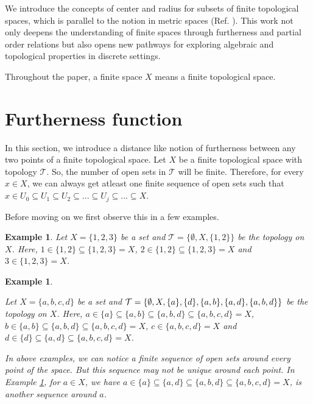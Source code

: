 \documentclass[12pt]{amsart}
\newtheorem{example}[definition]{Example}
\begin{document}
		We introduce the concepts of center and radius for subsets of finite topological spaces, which is parallel to the notion in metric spaces (Ref. \cite{Badra}). 
    	This work not only deepens the understanding of finite spaces through furtherness and partial order relations but also opens new pathways for exploring algebraic and topological properties in discrete settings.\par
	

	
	Throughout the paper, a finite space $X$ means a finite topological space.
	
	
	
	\section{\textbf{Furtherness function}}	\label{s2.1}
	
	
	In this section, we introduce a distance like notion of furtherness between any two points of a finite topological space. Let $X$ be a finite topological space with topology $\mathcal{T}$.
	So, the number of open sets in $\mathcal{T}$ will be finite. Therefore, for every $x\in X$, we can always get atleast one finite sequence of open sets such that $x\in U_0\subseteq U_1\subseteq U_2 \subseteq...\subseteq U_j\subseteq  ... \subseteq  X$.\par
	
	Before moving on we first observe this in a few examples.
	
	\begin{example}\label{2.1}
		{\normalfont
			Let $X=\{1,2,3\}$ be a set and $\mathcal{T}=\{\emptyset,X,\{1,2\}\}$ be the topology on $X$.
			Here, $1\in \{1,2\}\subseteq\{1,2,3\}=X$,  $2\in \{1,2\}\subseteq\{1,2,3\}=X$ and $3 \in\{1,2,3\}=X$.
		}
	\end{example}
	
	\begin{example}\label{2.2}
		{\normalfont
			Let $X=\{a,b,c,d\}$ be a set and $\mathcal{T}=\{\emptyset,X,\{a\},\{d\},\{a,b\},\{a,d\},\\ 
			\{a,b,d\}\}$ be the topology on $X$. %
			Here, $a\in\{a\}\subseteq \{a,b\}\subseteq\{a,b,d\}\subseteq\{a,b,c,d\}=X$, $b\in \{a,b\}\subseteq\{a,b,d\}\subseteq\{a,b,c,d\}=X$, $c\in\{a,b,c,d\}=X$ and $d\in\{d\}\subseteq \{a,d\}\subseteq\{a,b,c,d\}=X$.\par 
			In above examples, we can notice a finite sequence of open sets around every point of the space. But this sequence may not be unique around each point. In Example \ref{2.2}, for $a\in X$, we have $a\in\{a\}\subseteq \{a,d\}\subseteq\{a,b,d\}\subseteq\{a,b,c,d\}=X$, is another sequence around $a$.
		}
	\end{example}
	
\end{document}
